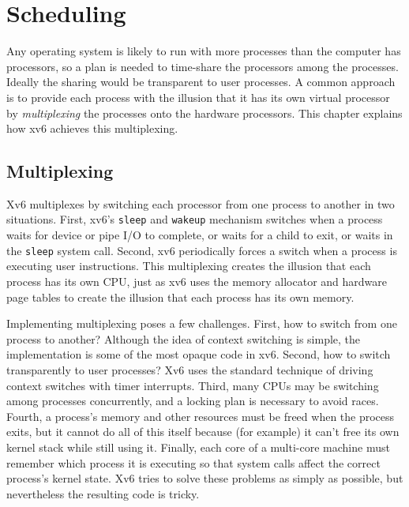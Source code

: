 % 
%  
\chapter{Scheduling}
\label{CH:SCHED}

Any operating system is likely to run with more processes than the
computer has processors, so a plan is needed to time-share the
processors among the processes. Ideally the sharing would be transparent to user
processes.  A common approach is to provide each process
with the illusion that it has its own virtual processor by
\textit{multiplexing}
the processes onto the hardware processors.
This chapter explains how xv6 achieves this multiplexing.
\section{Multiplexing}

Xv6 multiplexes by switching each processor from one process to
another in two situations. First, xv6's
\lstinline{sleep}
and
\lstinline{wakeup}
mechanism switches when a process waits
for device or pipe I/O to complete, or waits for a child
to exit, or waits in the
\lstinline{sleep}
system call.
Second, xv6 periodically forces a switch when a process
is executing user instructions.
This multiplexing creates the illusion that
each process has its own CPU, just as xv6 uses the memory allocator and hardware
page tables to create the illusion that each process has its own memory.

Implementing multiplexing poses a few challenges. First, how to switch from one
process to another? 
Although the idea of context switching
is simple, the implementation is some of the most opaque code
in xv6. Second, how to switch transparently to user processes?  Xv6 uses the
standard technique of driving context switches with timer interrupts.
Third, many CPUs may be switching among processes concurrently, and a
locking plan is necessary to avoid races. Fourth, a process's
memory and other resources must be freed when the process exits,
but it cannot do all of this itself
because (for example) it can't free its own kernel stack while still using it.
Finally, each core of a multi-core machine must remember which
process it is executing so that system calls affect the correct
process's kernel state.
Xv6 tries to solve these problems as
simply as possible, but nevertheless the resulting code is
tricky.

